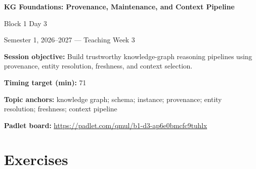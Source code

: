 \documentclass[11pt]{article}
\begin{document}
\begin{center}\LARGE\bfseries KG Foundations: Provenance, Maintenance, and Context Pipeline\end{center}

\begin{center}\large Block 1 Day 3\end{center}

\begin{center}Semester 1, 2026--2027 --- Teaching Week 3\end{center}

\begin{tcolorbox}[colback=MidnightBlue!4,colframe=MidnightBlue,title={Session Overview},fonttitle=\bfseries,breakable]
\textbf{Session objective:} Build trustworthy knowledge-graph reasoning pipelines using provenance, entity resolution, freshness, and context selection.

\textbf{Timing target (min):} 71

\textbf{Topic anchors:} knowledge graph; schema; instance; provenance; entity resolution; freshness; context pipeline

\textbf{Padlet board:} \url{https://padlet.com/qmul/b1-d3-ap6e0bmcfc9tuhlx}
\end{tcolorbox}

\section*{Exercises}
\end{document}
